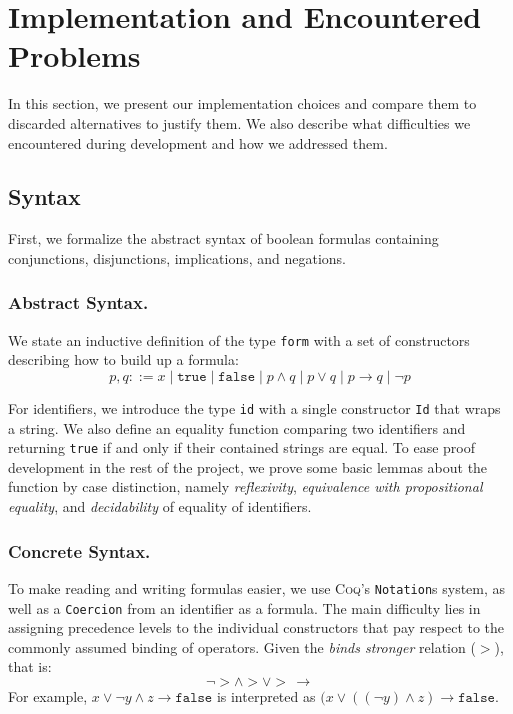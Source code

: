 \section{Implementation and Encountered Problems}

In this section, we present our implementation choices and compare them to discarded alternatives to justify them. 
We also describe what difficulties we encountered during development and how we addressed them.

\subsection{Syntax}

First, we formalize the abstract syntax of boolean formulas containing conjunctions, disjunctions, implications, and negations. 

\subsubsection{Abstract Syntax.}

We state an inductive definition of the type \texttt{form} with a set of constructors describing how to build up a formula:
\begin{equation}
    p, q ::= x\;|\;\texttt{true}\;|\;\texttt{false}\;|\;p \land q\;|\;p \lor q\;|\;p \rightarrow q\;|\;\neg p
\end{equation}

For identifiers, we introduce the type \texttt{id} with a single constructor \texttt{Id} that wraps a string. We also define an equality function comparing two identifiers and returning \texttt{true} if and only if their contained strings are equal. To ease proof development in the rest of the project, we prove some basic lemmas about the function by case distinction, namely \emph{reflexivity}, \emph{equivalence with propositional equality}, and \emph{decidability} of equality of identifiers.

\subsubsection{Concrete Syntax.}

To make reading and writing formulas easier, we use \textsc{Coq}'s \texttt{Notation}s system, as well as a \texttt{Coercion} from an identifier as a formula. 
The main difficulty lies in assigning precedence levels to the individual constructors that pay respect to the commonly assumed binding of operators. 
Given the \emph{binds stronger} relation ($>$), that is:
\begin{equation}
    \neg > \land > \lor >\,\rightarrow
\end{equation}
For example, $x \lor \neg y \land z \rightarrow \texttt{false}$ is interpreted as $(x \lor ((\neg y) \land z) \rightarrow \texttt{false}$. 

